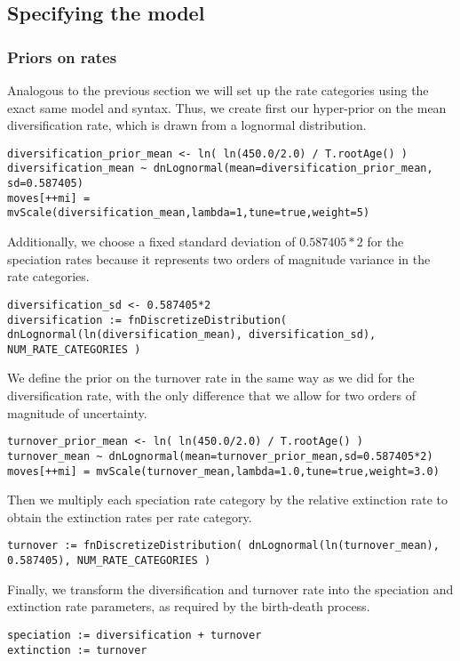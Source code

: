 \subsection{Specifying the model}

\subsubsection{Priors on rates}
Analogous to the previous section we will set up the rate categories using the exact same model and \Rev syntax.
Thus, we create first our hyper-prior on the mean diversification rate, which is drawn from a lognormal distribution.
{\tt \begin{snugshade*}
\begin{lstlisting}
diversification_prior_mean <- ln( ln(450.0/2.0) / T.rootAge() )
diversification_mean ~ dnLognormal(mean=diversification_prior_mean, sd=0.587405)
moves[++mi] = mvScale(diversification_mean,lambda=1,tune=true,weight=5)
\end{lstlisting}
\end{snugshade*}}
Additionally, we choose a fixed standard deviation of $0.587405*2$ for the speciation rates because it represents two orders of magnitude variance in the rate categories.
{\tt \begin{snugshade*}
\begin{lstlisting}
diversification_sd <- 0.587405*2
diversification := fnDiscretizeDistribution( dnLognormal(ln(diversification_mean), diversification_sd), NUM_RATE_CATEGORIES )
\end{lstlisting}
\end{snugshade*}}
We define the prior on the turnover rate in the same way as we did for the diversification rate, with the only difference that we allow for two orders of magnitude of uncertainty.
{\tt \begin{snugshade*}
\begin{lstlisting}
turnover_prior_mean <- ln( ln(450.0/2.0) / T.rootAge() )
turnover_mean ~ dnLognormal(mean=turnover_prior_mean,sd=0.587405*2) 
moves[++mi] = mvScale(turnover_mean,lambda=1.0,tune=true,weight=3.0)
\end{lstlisting}
\end{snugshade*}}
Then we multiply each speciation rate category by the relative extinction rate to obtain the extinction rates per rate category.
{\tt \begin{snugshade*}
\begin{lstlisting}
turnover := fnDiscretizeDistribution( dnLognormal(ln(turnover_mean), 0.587405), NUM_RATE_CATEGORIES )
\end{lstlisting}
\end{snugshade*}}
Finally, we transform the diversification and turnover rate into the speciation and extinction rate parameters, as required by the birth-death process.
{\tt \begin{snugshade*}
\begin{lstlisting}
speciation := diversification + turnover
extinction := turnover 
\end{lstlisting}
\end{snugshade*}}

